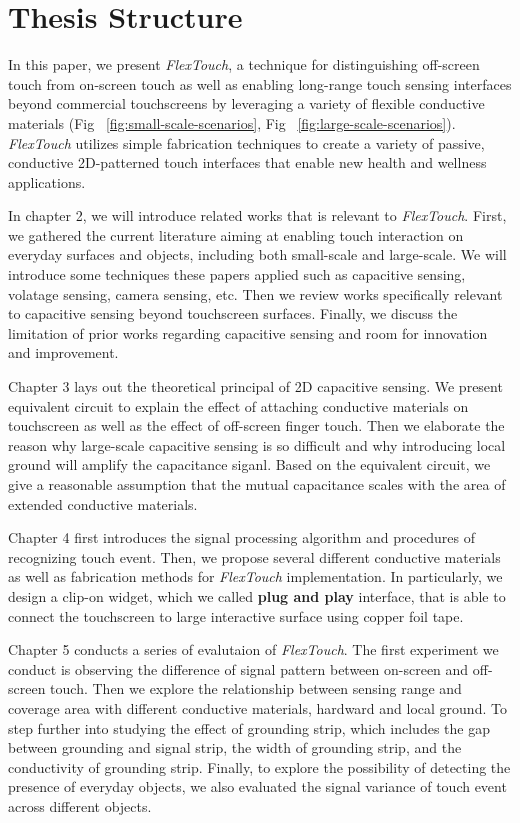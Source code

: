 \section{Thesis Structure}
In this paper, we present \textit{FlexTouch}, a technique for distinguishing off-screen touch from on-screen touch as well as enabling long-range touch sensing interfaces beyond commercial touchscreens by leveraging a variety of flexible conductive materials (Fig ~\ref{fig:small-scale-scenarios}, Fig ~\ref{fig:large-scale-scenarios}). \textit{FlexTouch} utilizes simple fabrication techniques to create a variety of passive, conductive 2D-patterned touch interfaces that enable new health and wellness applications.

In chapter 2, we will introduce related works that is relevant to \textit{FlexTouch}. First, we gathered the current literature aiming at enabling touch interaction on everyday surfaces and objects, including both small-scale and large-scale. We will introduce some techniques these papers applied such as capacitive sensing, volatage sensing, camera sensing, etc. Then we review works specifically relevant to capacitive sensing beyond touchscreen surfaces. Finally, we discuss the limitation of prior works regarding capacitive sensing and room for innovation and improvement.

Chapter 3 lays out the theoretical principal of 2D capacitive sensing. We present equivalent circuit to explain the effect of attaching conductive materials on touchscreen as well as the effect of off-screen finger touch. Then we elaborate the reason why large-scale capacitive sensing is so difficult and why introducing local ground will amplify the capacitance siganl. Based on the equivalent circuit, we give a reasonable assumption that the mutual capacitance scales with the area of extended conductive materials.

Chapter 4 first introduces the signal processing algorithm and procedures of recognizing touch event. Then, we propose several different conductive materials as well as fabrication methods for \textit{FlexTouch} implementation. In particularly, we design a clip-on widget, which we called \textbf{plug and play} interface,  that is able to connect the touchscreen to large interactive surface using copper foil tape.

Chapter 5 conducts a series of evalutaion of \textit{FlexTouch}. The first experiment we conduct is observing the difference of signal pattern between on-screen and off-screen touch. Then we explore the relationship between sensing range and coverage area with different conductive materials, hardward and local ground. To step further into studying the effect of grounding strip, which includes the gap between grounding and signal strip, the width of grounding strip, and the conductivity of grounding strip. Finally, to explore the possibility of detecting the presence of everyday objects, we also evaluated the signal variance of touch event across different objects.

